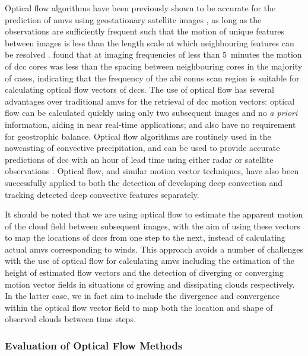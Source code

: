 Optical flow algorithms have been previously shown to be accurate for the prediction of \acrshort{amv}s using geostationary satellite images \citep{wu_deriving_2016}, as long as the observations are sufficiently frequent such that the motion of unique features between images is less than the length scale at which neighbouring features can be resolved \citep{bresky_feasibility_2006}.
\citet{heikenfeld_tobac_2019} found that at imaging frequencies of less than 5~minutes the motion of \acrshort{dcc} cores was less than the spacing between neighbouring cores in the majority of cases, indicating that the frequency of the \acrshort{abi} \acrshort{conus} scan region is suitable for calculating optical flow vectors of \acrshort{dcc}s.
The use of optical flow has several advantages over traditional \acrshort{amv}s for the retrieval of \acrshort{dcc} motion vectors: optical flow can be calculated quickly using only two subsequent images and no \textit{a priori} information, aiding in near real-time applications; and also have no requirement for geostrophic balance. 
Optical flow algorithms are routinely used in the nowcasting of convective precipitation, and can be used to provide accurate predictions of \acrshort{dcc} with an hour of lead time using either radar or satellite observations \citep[e.g.][]{bowler_development_2004, bechini_enhanced_2017, woo_operational_2017}.
Optical flow, and similar motion vector techniques, have also been successfully applied to both the detection of developing deep convection \citep{zinner_cb-tram_2008, zhang_locating_2014} and tracking detected deep convective features \citep{senf_size-resolved_2018} separately.

It should be noted that we are using optical flow to estimate the apparent motion of the cloud field between subsequent images, with the aim of using these vectors to map the locations of \acrshort{dcc}s from one step to the next, instead of calculating actual \acrshort{amv}s corresponding to winds.
This approach avoids a number of challenges with the use of optical flow for calculating \acrshort{amv}s including the estimation of the height of estimated flow vectors and the detection of diverging or converging motion vector fields in situations of growing and dissipating clouds respectively.
In the latter case, we in fact aim to include the divergence and convergence within the optical flow vector field to map both the location and shape of observed clouds between time steps.

\subsubsection{Evaluation of Optical Flow Methods}


